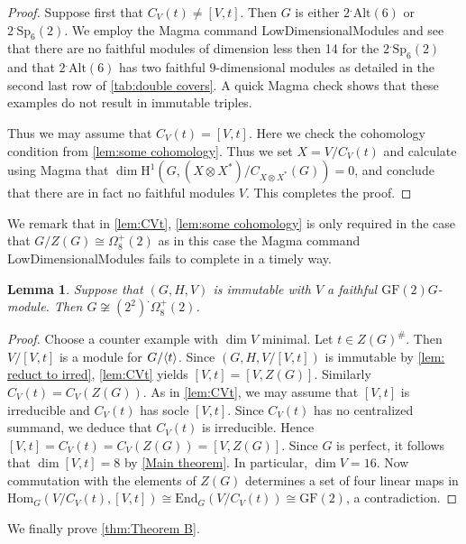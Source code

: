 \documentclass[12pt]{amsart}
\newtheorem{lemma}[theorem]{Lemma}
\theoremstyle{remark}
\theoremstyle{notation}
\theoremstyle{definition}
\newcommand{\GF}{\mathrm{GF}}
\newcommand{\Sp}{\mathrm{Sp}}
\newcommand{\0}{\emptyset}
\newcommand{\Alt}{\mathrm{Alt}}
\DeclarePairedDelimiter{\gen}{\langle}{\rangle}
\begin{document}
\begin{proof}
Suppose first that $C_V(t)\ne [V,t]$. Then $G$ is either $2^.\Alt(6)$ or $2^.\Sp_6(2)$. We employ the {\sc Magma} command {\sc LowDimensionalModules} and see that there are no faithful modules of dimension less then 14 for the $2^.\Sp_6(2)$ and that  $2^.\Alt(6)$ has   two  faithful $9$-dimensional modules as detailed in the second last row of \cref{tab:double covers}. A quick {\sc Magma} check shows that these examples do not result in immutable triples.


Thus we may assume that $C_V(t)=[V,t]$. Here we check the cohomology condition from \cref{lem:some cohomology}. Thus we set $X= V/C_V(t)$ and calculate using {\sc Magma} that $\dim \mathrm H^1(G,(X\otimes X^*)/C_{X\otimes X^*}(G))=0$,  and conclude that there are in fact no faithful modules $V$. This completes the proof.
\end{proof}

We remark that in \cref{lem:CVt}, \cref{lem:some cohomology} is only required in the case that $G/Z(G)\cong \Omega^+_8(2)$ as in this case the {\sc Magma} command {\sc LowDimensionalModules} fails to complete in a timely way.



\begin{lemma}\label{ZOdd}
Suppose that $(G,H,V)$ is immutable with $V$ a faithful $\GF(2)G$-module. Then $G \not \cong (2^2)^.\Omega_{8}^+(2)$.
\end{lemma}

\begin{proof} Choose a counter example with $\dim V$ minimal.
Let $t \in Z(G)^\#$. Then $V/[V,t]$ is a module for $G/\gen{t}$.  Since $(G ,H ,V/[V,t])$ is immutable by \cref{lem: reduct to irred}, \cref{lem:CVt} yields $[V,t]=[V,Z(G)]$. Similarly $C_V(t)=C_V(Z(G))$. As in \cref{lem:CVt}, we may assume that $[V,t]$ is irreducible and $C_V(t)$ has socle $[V,t]$.  Since $C_V(t)$ has no centralized summand, we deduce that $C_V(t)$ is irreducible.  Hence $[V,t]=C_V(t)=C_V(Z(G))=[V,Z(G)]$. Since $G$ is perfect, it follows that $\dim [V,t]=8$ by \cref{Main theorem}. In particular, $\dim V=16$. Now commutation with the elements of $Z(G)$ determines a set of four linear maps in $\mathrm{Hom}_G(V/C_V(t),[V,t])\cong \mathrm{End}_G(V/C_V(t)) \cong \GF(2)$, a contradiction.
\end{proof}



We finally prove \cref{thm:Theorem B}.
\end{document}
